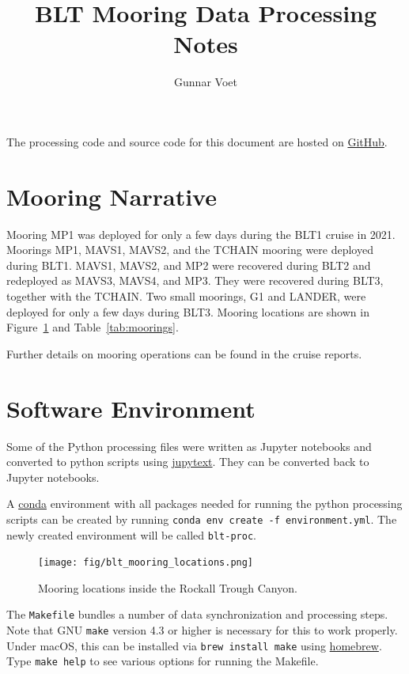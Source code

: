 \documentclass[10pt,letterpaper]{article}
\title{BLT Mooring Data Processing Notes}
\author{Gunnar Voet}
\newcommand{\clink}[2]{{\color{modblue2} \href{#1}{#2}}}
\begin{document}
\maketitle

The processing code and source code for this document are hosted on \clink{https://github.com/gunnarvoet/blt-proc}{GitHub}.

\section*{Mooring Narrative}
\label{sec:mooring_operations}

Mooring MP1 was deployed for only a few days during the BLT1 cruise in 2021.
Moorings MP1, MAVS1, MAVS2, and the TCHAIN mooring were deployed during BLT1.
MAVS1, MAVS2, and MP2 were recovered during BLT2 and redeployed as MAVS3, MAVS4, and MP3.
They were recovered during BLT3, together with the TCHAIN.
Two small moorings, G1 and LANDER, were deployed for only a few days during BLT3.
Mooring locations are shown in Figure~\ref{fig:mooring_map} and Table~\ref{tab:moorings}.



Further details on mooring operations can be found in the cruise reports.

\section*{Software Environment}
\label{sec:software_environment}

Some of the Python processing files were written as Jupyter notebooks and converted to python scripts using \clink{https://jupytext.readthedocs.io/en/latest/}{jupytext}. They can be converted back to Jupyter notebooks.

A \clink{https://docs.conda.io/en/latest/}{conda} environment with all packages needed for running the python processing scripts can be created by running \lstinline{conda env create -f environment.yml}. The newly created environment will be called \lstinline{blt-proc}.


\begin{figure}[htpb]
    \centering
    \texttt{[image: fig/blt\_mooring\_locations.png]}
    \caption{Mooring locations inside the Rockall Trough Canyon.}
    \label{fig:mooring_map}
\end{figure}


The \lstinline{Makefile} bundles a number of data synchronization and processing steps.
Note that GNU \lstinline{make} version 4.3 or higher is necessary for this to work properly.
Under macOS, this can be installed via \lstinline{brew install make} using \clink{https://brew.sh/}{homebrew}.
Type \lstinline{make help} to see various options for running the Makefile.
\end{document}
